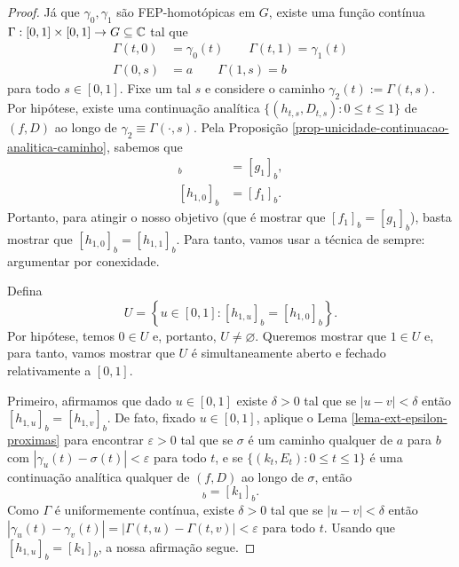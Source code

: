     \begin{proof}
        Já que $\gamma_0, \gamma_1$ são FEP-homotópicas em $G$, existe uma função contínua
        $\Gamma: [0,1]\times[0,1]\to G\subseteq\mathbb{C}$ tal que
        \begin{align*}
            \Gamma(t,0) &= \gamma_0(t) \qquad \Gamma(t,1) = \gamma_1(t) \\
            \Gamma(0,s) &= a \qquad \Gamma(1,s) = b
        \end{align*}
        para todo $s\in [0,1]$. Fixe um tal $s$ e considere o caminho 
        $\gamma_2(t) := \Gamma(t,s)$. Por hipótese, existe uma continuação analítica
        $\{ (h_{t,s}, D_{t,s}) : 0\leq t\leq 1 \}$ de $(f,D)$ ao longo de 
        $\gamma_2 \equiv \Gamma(\cdot, s)$. Pela 
        Proposição \ref{prop-unicidade-continuacao-analitica-caminho}, sabemos que
        \begin{align*}
            [h_{1,1}]_b &= [g_1]_b, \\
            [h_{1,0}]_b &= [f_1]_b.
        \end{align*}
        Portanto, para atingir o nosso objetivo (que é mostrar que $[f_1]_b = [g_1]_b$),
        basta mostrar que $[h_{1,0}]_b = [h_{1,1}]_b$. Para tanto, vamos usar a técnica
        de sempre: argumentar por conexidade.
        
        Defina
        \begin{equation*}
            U = \left\{ u\in [0,1] : [h_{1,u}]_b = [h_{1,0}]_b \right\}.
        \end{equation*}
        Por hipótese, temos $0\in U$ e, portanto, $U\neq\varnothing$. Queremos mostrar que
        $1\in U$ e, para tanto, vamos mostrar que $U$ é simultaneamente aberto e fechado
        relativamente a $[0,1]$.
        
        Primeiro, afirmamos que dado $u\in [0,1]$ existe $\delta > 0$ tal que se 
        $|u - v| < \delta$ então $[h_{1,u}]_b = [h_{1,v}]_b$. De fato, fixado $u\in [0,1]$,
        aplique o Lema \ref{lema-ext-epsilon-proximas} para encontrar $\varepsilon > 0$
        tal que se $\sigma$ é um caminho qualquer de $a$ para $b$ com 
        $|\gamma_u(t) - \sigma(t)| < \varepsilon$ para todo $t$, e se 
        $\{ (k_t, E_t): 0\leq t\leq 1 \}$ é uma continuação analítica qualquer de $(f,D)$
        ao longo de $\sigma$, então
        \begin{equation*}
            [h_{1,u}]_b = [k_1]_b.
        \end{equation*}
        Como $\Gamma$ é uniformemente contínua, existe $\delta > 0$ tal que se $|u-v|<\delta$
        então $|\gamma_u(t) - \gamma_v(t)| = |\Gamma(t,u) - \Gamma(t,v)| < \varepsilon$
        para todo $t$. Usando que $[h_{1,u}]_b = [k_1]_b$, a nossa afirmação segue.
        

\end{proof}
